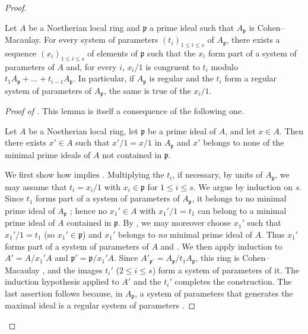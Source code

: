 \begin{proof}
\begin{lemma}[18.11.3.3]
\label{IV.18.11.3.3}
Let $A$ be a Noetherian local ring and $\mathfrak{p}$ a prime ideal such that $A_{\mathfrak{p}}$ is Cohen--Macaulay. For every system of parameters $(t_i)_{1\leq i\leq s}$ of $A_{\mathfrak{p}}$, there exists a sequence $(x_i)_{1\leq i\leq s}$ of elements of $\mathfrak{p}$ such that the $x_i$ form part of a system of parameters of $A$
and, for every $i$, $x_i/1$ is congruent to $t_i$ modulo $t_1A_{\mathfrak{p}}+\ldots+t_{i-1}A_{\mathfrak{p}}$. In particular, if $A_{\mathfrak{p}}$ is regular and the $t_i$ form a \textup{regular} system of parameters of $A_{\mathfrak{p}}$, the same is true of the $x_i/1$.
\end{lemma}

\begin{proof}[Proof of ]
This lemma is itself a consequence of the following one.

\begin{lemma}[18.11.3.4]
\label{IV.18.11.3.4}
Let $A$ be a Noetherian local ring, let $\mathfrak{p}$ be a prime ideal of $A$, and let $x\in A$. Then there exists $x'\in A$ such that $x'/1=x/1$ in $A_{\mathfrak{p}}$ and $x'$ belongs to none of the minimal prime ideals of $A$ not contained in $\mathfrak{p}$.
\end{lemma}
We first show how  implies . Multiplying the $t_i$, if necessary, by units of $A_{\mathfrak{p}}$, we may assume that $t_i=x_i/1$ with $x_i\in\mathfrak{p}$ for $1\leq i\leq s$. We argue by induction on $s$. Since $t_1$ forms part of a system of parameters of $A_{\mathfrak{p}}$, it belongs to no minimal prime ideal of $A_{\mathfrak{p}}$ ; hence no $x_1'\in A$ with $x_1'/1=t_1$ can belong to a minimal prime ideal of $A$ contained in $\mathfrak{p}$. By , we may moreover choose $x_1'$ such that $x_1'/1=t_1$ (so $x_1'\in\mathfrak{p}$) and $x_1'$ belongs to \emph{no} minimal prime ideal of $A$. Thus $x_1'$ forms part of a system of parameters of $A$  and . We then apply induction to $A'=A/x_1'A$ and $\mathfrak{p}'=\mathfrak{p}/x_1'A$. Since $A'_{\mathfrak{p}'}=A_{\mathfrak{p}}/t_1A_{\mathfrak{p}}$, this ring is Cohen--Macaulay , and the images $t_i'$ ($2\leq i\leq s$) form a system of parameters of it. The induction hypothesis applied to $A'$ and the $t_i'$ completes the construction. The last assertion follows because, in $A_{\mathfrak{p}}$, a system of parameters that generates the maximal ideal is a regular system of parameters .


\end{proof}
\end{proof}
